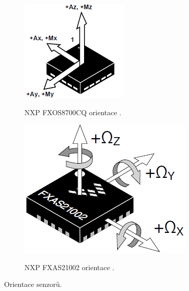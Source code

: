 \begin{figure}[ht]
    \centering
	\begin{subfigure}{0.35\textwidth}
	    \includegraphics[width = \textwidth]{Figures/FXOS_Orientation.png}
        \label{fig:FXOS_Orientation}
        \caption{NXP FXOS8700CQ orientace \cite{FXOS8700CQ}.}
	\end{subfigure}
    \begin{subfigure}{0.35\textwidth}
        \includegraphics[width = \textwidth]{Figures/FXAS_Orientation.png}
        \label{fig:FXAS_Orientation}
         \caption{NXP FXAS21002 orientace \cite{FXAS21002}.}
    \end{subfigure}
	\caption{Orientace senzorů.}
\end{figure}

